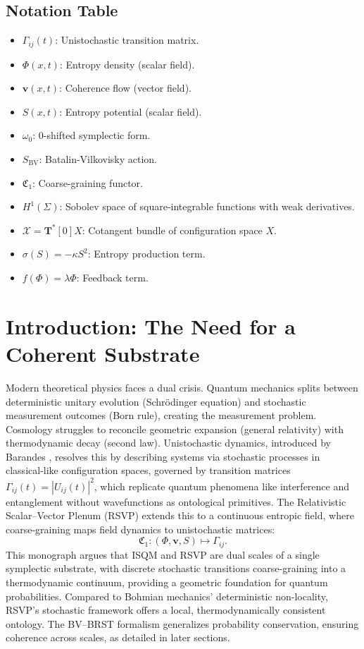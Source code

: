 \documentclass[12pt]{article}
\begin{document}
\subsection{Notation Table}

\begin{itemize}[noitemsep]
\item \(\Gamma_{ij}(t)\): Unistochastic transition matrix.
\item \(\Phi(x,t)\): Entropy density (scalar field).
\item \(\mathbf{v}(x,t)\): Coherence flow (vector field).
\item \(S(x,t)\): Entropy potential (scalar field).
\item \(\omega_0\): 0-shifted symplectic form.
\item \(S_{\mathrm{BV}}\): Batalin-Vilkovisky action.
\item \(\mathfrak{C}_1\): Coarse-graining functor.
\item \(H^1(\Sigma)\): Sobolev space of square-integrable functions with weak derivatives.
\item \(\mathcal{X} = \mathbf{T}^*[0]X\): Cotangent bundle of configuration space \(X\).
\item \(\sigma(S) = -\kappa S^2\): Entropy production term.
\item \(f(\Phi) = \lambda \Phi\): Feedback term.
\end{itemize}

\section{Introduction: The Need for a Coherent Substrate}

Modern theoretical physics faces a dual crisis. Quantum mechanics splits between deterministic unitary evolution (Schrödinger equation) and stochastic measurement outcomes (Born rule), creating the measurement problem. Cosmology struggles to reconcile geometric expansion (general relativity) with thermodynamic decay (second law). Unistochastic dynamics, introduced by Barandes \cite{Barandes2023}, resolves this by describing systems via stochastic processes in classical-like configuration spaces, governed by transition matrices \(\Gamma_{ij}(t) = |U_{ij}(t)|^2\), which replicate quantum phenomena like interference and entanglement without wavefunctions as ontological primitives. The Relativistic Scalar–Vector Plenum (RSVP) extends this to a continuous entropic field, where coarse-graining maps field dynamics to unistochastic matrices:
\[
\mathfrak{C}_1: (\Phi, \mathbf{v}, S) \mapsto \Gamma_{ij}.
\]
This monograph argues that ISQM and RSVP are dual scales of a single symplectic substrate, with discrete stochastic transitions coarse-graining into a thermodynamic continuum, providing a geometric foundation for quantum probabilities. Compared to Bohmian mechanics’ deterministic non-locality, RSVP’s stochastic framework offers a local, thermodynamically consistent ontology. The BV–BRST formalism generalizes probability conservation, ensuring coherence across scales, as detailed in later sections.
\end{document}
